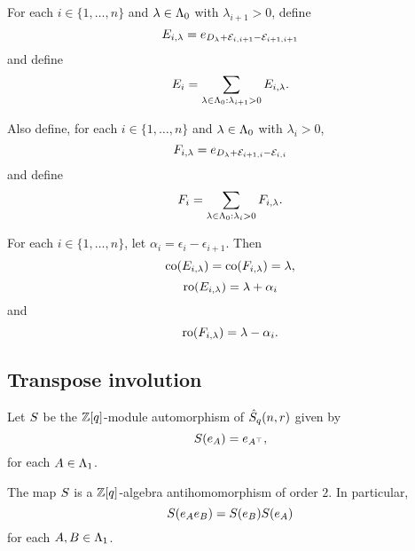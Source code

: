 \documentclass[a4paper, 11pt]{report}
\begin{document}
For each $i\in\{1,\ldots,n\}$ and $\lambda\in\Lambda_0{}$ with $\lambda_{i+1}>0$, define
\begin{equation*}
E_{i,\lambda} = e_{D_\lambda + \mathcal{E}_{i,i+1} - \mathcal{E}_{i+1,i+1}}
\end{equation*}
and define
\begin{equation*}
E_i = \sum_{\lambda\in\Lambda_0{}:\lambda_{i+1}>0} E_{i,\lambda}.
\end{equation*}

Also define, for each $i\in\{1,\ldots,n\}$ and $\lambda\in\Lambda_0{}$ with $\lambda_i>0$,
\begin{equation*}
F_{i,\lambda} = e_{D_\lambda + \mathcal{E}_{i+1,i} - \mathcal{E}_{i,i}}
\end{equation*}
and define
\begin{equation*}
F_i = \sum_{\lambda\in\Lambda_0{}:\lambda_i>0} F_{i,\lambda}.
\end{equation*}

For each $i\in\{1,\ldots,n\}$, let $\alpha_i=\epsilon_i-\epsilon_{i+1}$. Then
\begin{equation*}
\operatorname{co}(E_{i,\lambda}) = \operatorname{co}(F_{i,\lambda})=\lambda,
\end{equation*}
\begin{equation*}
\operatorname{ro}(E_{i,\lambda}) = \lambda +\alpha_i
\end{equation*}
and
\begin{equation*}
\operatorname{ro}(F_{i,\lambda}) = \lambda - \alpha_i.
\end{equation*}

\subsection{Transpose involution}

Let $S{}$ be the $\mathbb{Z}[q]$-module automorphism of $\hat{S}_q(n,r)$ given by
\begin{equation*}
S{(e_A)} = e_{A^\top},
\end{equation*}
for each $A\in\Lambda_1{}$.

\begin{lemma}\label{lemma:transpose-involution}
The map $S{}$ is a $\mathbb{Z}[q]$-algebra antihomomorphism of order $2$. In particular,
\begin{equation*}
S{(e_A e_B)} = S{(e_B)}S{(e_A)}
\end{equation*}
for each $A,B\in\Lambda_1{}$.
\end{lemma}
\end{document}
